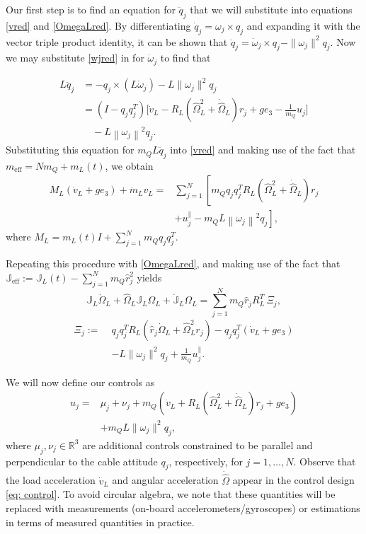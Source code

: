 \documentclass[letterpaper, 10 pt, conference]{ieeeconf}  %
\newcommand{\R}{\mathbb{R}}
\newcommand{\eff}{\text{eff}}
\begin{document}
Our first step is to find an equation for $\ddot{q}_j$ that we will substitute into equations \eqref{vred} and \eqref{OmegaLred}. By differentiating $\dot{q}_j = \omega_j \times q_j$ and expanding it with the vector triple product identity, it can be shown that $\ddot{q}_j = \dot{\omega}_j \times q_j - \|\omega_j \|^2 q_j$. Now we may substitute \eqref{wjred} in for $\dot{\omega}_j$ to find that

\begin{align*}
L \ddot{q}_j &= -q_j \times (L\dot{\omega}_j) - L\|\omega_j\|^2 q_j \\
&= (I - q_j q_j^T)\Big[\dot{v}_L - R_L(\hat{\Omega}_L^2 + \dot{\hat{\Omega}}_L)r_j + ge_3 - \frac1{m_Q} u_j \Big] \\
&\quad -L\left\|\omega_j\right\|^2 q_j.
\end{align*} 
Substituting this equation for $m_Q L \ddot{q}_j$ into \eqref{vred} and making use of the fact that $m_{\eff} = Nm_Q + m_L(t)$, we obtain
\begin{align}
M_L (\dot{v}_L + ge_3) + \dot{m}_L v_L = &\sum_{j=1}^N \left[m_Qq_j q_j^T R_L (\hat{\Omega}_L^2 + \dot{\hat{\Omega}}_L)r_j\right.\nonumber\\ &+\left. u_j^{\parallel} - m_Q L \left\|\omega_j\right\|^2 q_j \right],\label{xLdyn_Lee}
\end{align}where $M_L = m_L(t) I + \sum_{j=1}^N m_Q q_j q_j^T$. %

Repeating this procedure with \eqref{OmegaLred}, and making use of the fact that $\mathbb{J}_{\eff} := \mathbb{J}_L(t) - \sum_{j=1}^N m_Q \hat{r}_j^2$ yields
\begin{equation}\label{OmegaLdyn_Lee}
\mathbb{J}_L \dot{\Omega}_L
+ \hat{\Omega}_L \mathbb{J}_L \Omega_L
+ \dot{\mathbb{J}}_L \Omega_L
= \sum_{j=1}^N m_Q \hat{r}_j R_L^T \,\Xi_j ,
\end{equation}
\begin{equation}
\begin{aligned}
\Xi_j :=\;&
q_j q_j^T R_L(\hat{r}_j \dot{\Omega}_L + \hat{\Omega}_L^2 r_j)
- q_j q_j^T(\dot{v}_L + g e_3) \\
&- L\|\omega_j\|^2 q_j
+ \frac{1}{m_Q}u_j^{\parallel}.
\end{aligned}
\end{equation}


We will now define our controls as \begin{align}
    u_j =& \mu_j + \nu_j + m_Q (\dot{v}_L + R_L(\hat{\Omega}^2_L + \dot{\hat{\Omega}}_L )r_j + ge_3)\label{eq: control}\\ &+ m_Q L \|\omega_j\|^2 q_j,\nonumber
\end{align} where $\mu_j, \nu_j \in \R^3$ are additional controls constrained to be parallel and perpendicular to the cable attitude $q_j$, respectively, for $j = 1, \dots, N.$ Observe that the load acceleration $\dot{v}_L$ and angular acceleration $\dot{\hat{\Omega}}$ appear in the control design \eqref{eq: control}. To avoid circular algebra, we note that these quantities will be replaced with measurements (on-board accelerometers/gyroscopes) or estimations in terms of measured quantities in practice.
\end{document}
